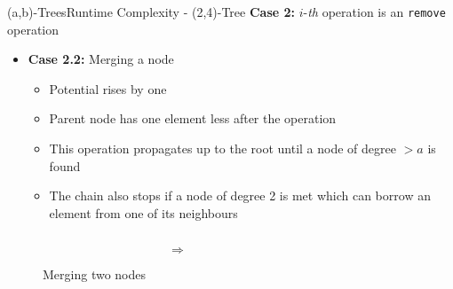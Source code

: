 \begin{frame}{(a,b)-Trees}{Runtime Complexity - (2,4)-Tree}
  \textbf{Case 2:}
  {\color{Mittel-Blau}$i$}-\textit{th} operation is an
  \texttt{\color{Mittel-Blau}remove} operation
  \begin{itemize}
    \item
      \textbf{Case 2.2:} Merging a node
    \begin{itemize}
      \item
        Potential rises by one
      \item
        Parent node has one element less after the operation
      \item
        This operation propagates up to the root until a node of degree
        {\color{Mittel-Blau}$>a$} is found
      \item
        The chain also stops if a node of {\color{Mittel-Blau}degree 2}
        is met which can borrow an element from one of its neighbours
    \end{itemize}
  \end{itemize}
  \begin{figure}
    \begin{columns}
      \begin{column}{0.35\linewidth}
        \begin{adjustbox}{width=\linewidth}
          
        \end{adjustbox}
      \end{column}
      \begin{column}{0.1\linewidth}
        \begin{center}
          $\Rightarrow$
        \end{center}
      \end{column}
      \begin{column}{0.35\linewidth}
        \begin{adjustbox}{width=0.85\linewidth}
          
        \end{adjustbox}
      \end{column}
    \end{columns}
    \caption{Merging two nodes}
    \label{fig:a_b_tree:merge_potential}
  \end{figure}
\end{frame}


